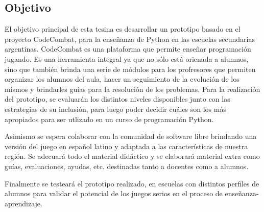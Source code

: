 \subsection{Objetivo}
\label{objetivo}

El objetivo principal de esta tesina es desarrollar un prototipo basado en el proyecto CodeCombat, para la enseñanza de Python en las escuelas secundarias argentinas. CodeCombat es una plataforma que permite enseñar programación jugando. Es una herramienta integral ya que no sólo está orienada a alumnos, sino que también brinda una serie de módulos para los profresores que permiten organizar los alumnos del aula, hacer un seguimiento de la evolución de los mismos y brindarles guías para la resolución de los problemas. Para la realización del prototipo, se evaluarán los distintos niveles disponibles junto con las estrategias de su inclusión, para luego poder decidir cuáles son los más apropiados para ser utlizado en un curso de programación Python.

Asimismo se espera colaborar con la comunidad de software libre brindando una versión del juego en español latino y adaptada a las características de nuestra región. Se adecuará todo el material didáctico y se elaborará material extra como guías, evaluaciones, ayudas, etc. destinadas tanto a docentes como a alumnos.

Finalmente se testeará el prototipo realizado, en escuelas con distintos perfiles de alumnos para validar el potencial de los juegos serios en el proceso de enseñanza-aprendizaje.
